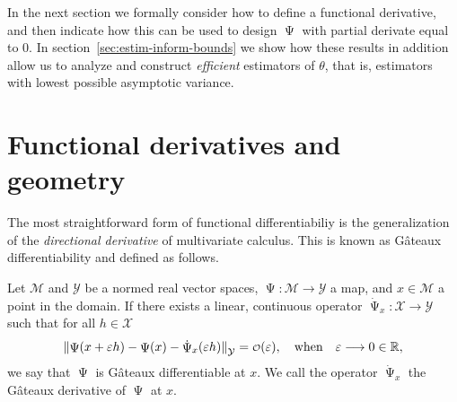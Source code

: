 \documentclass[a4,danish]{article}
\DeclareMathOperator{\TT}{\Psi}
\begin{document}
In the next section we formally consider how to define a functional derivative, and then indicate
how this can be used to design $\TT$ with partial derivate equal to 0. In
section~\ref{sec:estim-inform-bounds} we show how these results in addition allow us to analyze and
construct \textit{efficient} estimators of $\theta$, that is, estimators with lowest possible
asymptotic variance.

\section{Functional derivatives and geometry}
\label{sec:funct-deriv-geom}

The most straightforward form of functional differentiabiliy is the generalization of the
\textit{directional derivative} of multivariate calculus. This is known as Gâteaux differentiability
and defined as follows.

\begin{definition}
  Let $\mathcal{M}$ and $\mathcal{Y}$ be a normed real vector spaces,
  $\TT \colon \mathcal{M} \rightarrow \mathcal{Y}$ a map, and $x \in \mathcal{M}$ a point in the
  domain. If there exists a linear, continuous operator
  $\dot{\TT}_x \colon \mathcal{X} \rightarrow \mathcal{Y} $ such that for all $h \in \mathcal{X}$
  \begin{equation*}
    \left\Vert
      \TT(x + \epsilon h) - \TT(x) - \dot{\TT}_x(\epsilon h)
    \right\Vert_{\mathcal{Y}} = \smallO(\epsilon),
    \quad \text{when} \quad \epsilon \longrightarrow 0 \in \R,
  \end{equation*}
  we say that $\TT$ is Gâteaux differentiable at $x$. We call the operator $\dot{\TT}_x$ the
  Gâteaux derivative of $\TT$ at $x$.
\end{definition}
\end{document}

